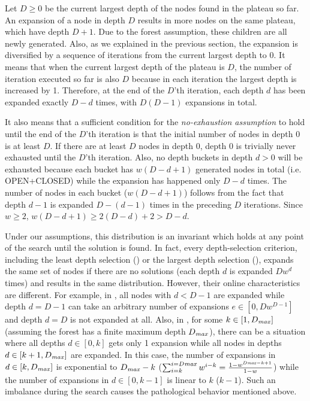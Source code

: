 Let $D\geq 0$ be the current largest depth of the nodes found in the plateau so far. An expansion of a node in
depth $D$ results in more nodes on the same plateau, which have depth $D+1$.  Due to the forest
assumption, these children are all newly generated. Also, as we explained in the previous section, the expansion is
diversified by a sequence of iterations from the current largest depth to 0.  It means that when the current
largest depth of the plateau is $D$, the number of iteration executed so far is also $D$ because
in each iteration the largest depth is increased by 1.
Therefore, at the end of the $D$'th iteration, each depth $d$ has been expanded exactly $D-d$ times, with $D(D-1)$
expansions in total.

It also means that a sufficient condition for the \emph{no-exhaustion assumption} to hold until the end of the $D$'th
iteration is that the initial number of nodes in depth 0 is at least $D$.  If there are at least $D$ nodes in depth
0, depth 0 is trivially never exhausted until the $D$'th iteration. Also, no depth buckets in depth $d>0$ will be exhausted 
because each bucket has $w(D-d+1)$ generated nodes in total (i.e. OPEN+CLOSED) while the expansion has
happened only $D-d$ times.
The number of nodes in each bucket ($w(D-d+1)$) follows from the fact that  depth $d-1$ is expanded $D-(d-1)$ times in the preceding $D$ iterations.
Since $w\geq 2$, $w(D-d+1)\geq 2(D-d)+2>D-d$.

Under our assumptions,  this distribution is an invariant which holds at any point of the search
until the solution is found. In fact, every depth-selection criterion, including the least depth selection (\fifo) or
the largest depth selection (\lifo), expands the same set of nodes if there are no solutions (each depth
$d$ is expanded $Dw^d$ times) and results in the same distribution.
However, their online characteristics are different.
For example, in \fifo, all nodes with $d<D-1$ are expanded while depth $d=D-1$ can take an arbitrary number of expansions $e \in [0, Dw^{D-1}]$ and depth $d=D$ is not expanded at all.
Also, in \lifo, for some $k\in [1,D_\mit{max}]$ (assuming the forest has a finite maximum depth $D_\mit{max}$), there can be a situation where all depths $d \in [0,k]$ gets only 1 expansion
while all nodes in depths $d \in [k+1,D_\mit{max}]$ are expanded. In this case, the number of expansions in $d \in [k,D_\mit{max}]$ is exponential to $D_\mit{max}-k$ ($\sum_{i=k}^{i=D\mit{max}}w^{i-k}=\frac{1-w^{D\mit{max}-k+1}}{1-w}$) while the number of expansions in $d \in [0,k-1]$ is linear to $k$ ($k-1$). Such an imbalance during the search causes the pathological behavior mentioned above.


